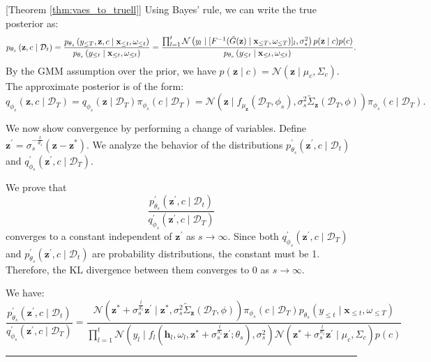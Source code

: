 \documentclass[10pt]{article} %
\newcommand{\BlackBox}{\rule{1.5ex}{1.5ex}}  %
\renewenvironment{proof}{\par\noindent{\bf Proof\ }}{\hfill\BlackBox\\[2mm]}
\newenvironment{proof}{\par\noindent{\bf Proof\ }}{\hfill\BlackBox\\[2mm]}
\begin{document}
\begin{proof}[Theorem \ref{thm:vaes_to_truell}]
Using Bayes' rule, we can write the true posterior as:
\[
p_{\theta_{s}}\left(\mathbf{z}, c \mid \mathcal{D}_t\right)
= \frac{
    p_{\theta_{s}}\left(y_{\leq T}, \mathbf{z}, c \mid \mathbf{x}_{\leq t}, \omega_{\leq t}\right)
    }{
    p_{\theta_{s}}\left(y_{\leq t} \mid \mathbf{x}_{\leq t}, \omega_{\leq t}\right)
    }
= \frac{
    \prod_{l=1}^t \mathcal{N}\left(y_l \mid [F^{-1}(\Tilde{G}(\mathbf{z}) \mid \mathbf{x}_{\leq T}, \omega_{\leq T})]_l, \sigma_{s}^2 \right) p(\mathbf{z} \mid c)p(c)
    }{
    p_{\theta_{s}}\left(y_{\leq t} \mid \mathbf{x}_{\leq t}, \omega_{\leq t}\right)
    }.
\]
By the GMM assumption over the prior, we have $p(\mathbf{z} \mid c) = \mathcal{N}(\mathbf{z} \mid \mu_c, \Sigma_c)$. The approximate posterior is of the form:
\[
q_{\phi_{s}}(\mathbf{z}, c \mid \mathcal{D}_T)
= q_{\phi_{s}}(\mathbf{z} \mid \mathcal{D}_T)\pi_{\phi_{s}}(c \mid \mathcal{D}_T) 
= \mathcal{N}(\mathbf{z} \mid f_{\mu_{\mathbf{z}}}(\mathcal{D}_T, \phi_{s}),\sigma_{s}^2\tilde{\Sigma}_{\mathbf{z}}(\mathcal{D}_T, \phi) )\pi_{\phi_{s}}(c \mid \mathcal{D}_T).
\]

We now show convergence by performing a change of variables. Define $\mathbf{z}^{\prime} = \sigma_{s}^{-\frac{t}{d_z}}(\mathbf{z} - \mathbf{z}^*)$. We analyze the behavior of the distributions $p_{\theta_{s}}^{\prime}(\mathbf{z}^{\prime}, c \mid \mathcal{D}_t)$ and $q_{\phi_{s}}^{\prime}(\mathbf{z}^{\prime}, c \mid \mathcal{D}_T)$. 

We prove that
\[
\frac{p_{\theta_{s}}^{\prime}(\mathbf{z}^{\prime}, c \mid \mathcal{D}_t)}{q_{\phi_{s}}^{\prime}(\mathbf{z}^{\prime}, c \mid \mathcal{D}_T)}
\]
converges to a constant independent of $\mathbf{z}^{\prime}$ as $s \to \infty$. Since both $q_{\phi_s}^{\prime}(\mathbf{z}^{\prime}, c \mid \mathcal{D}_T)$ and $p_{\theta_s}^{\prime}(\mathbf{z}^{\prime}, c \mid \mathcal{D}_t)$ are probability distributions, the constant must be 1. Therefore, the KL divergence between them converges to 0 as $s \to \infty$.

We have:
\begin{equation}
\frac{
p_{\theta_{s}}^{\prime}(\mathbf{z}^{\prime}, c \mid \mathcal{D}_t)
}{
q_{\phi_{s}}^{\prime}(\mathbf{z}^{\prime}, c \mid \mathcal{D}_T)
} 
= \frac{
\mathcal{N}(\mathbf{z}^*+ \sigma_{s}^{\frac{t}{d_z}} \mathbf{z}^{\prime} \mid \mathbf{z}^*, \sigma_{s}^{2}  \tilde{\Sigma}_{\mathbf{z}}(\mathcal{D}_T, \phi)) 
\pi_{\phi_{s}}(c \mid \mathcal{D}_T) p_{\theta_{s}}(y_{\leq t} \mid \mathbf{x}_{\leq t}, \omega_{\leq T})
}{
\prod_{l=1}^t
\mathcal{N}(y_l \mid f_l(\mathbf{h}_l, \omega_l, \mathbf{z}^*+ \sigma_{s}^{\frac{t}{d_z}} \mathbf{z}^{\prime}; \theta_{s}), \sigma_{s}^2)
\mathcal{N}(\mathbf{z}^*+ \sigma_{s}^{\frac{t}{d_z}} \mathbf{z}^{\prime} \mid \mu_c, \Sigma_c)p(c)
}
\end{equation}


\end{proof}
\end{document}
